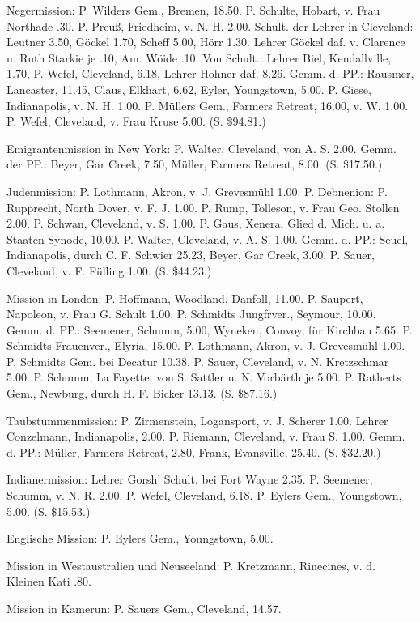 Negermission: P. Wilders Gem., Bremen, 18.50. P. Schulte, Hobart, v. Frau Northade .30. P. Preuß, Friedheim, v. N. H. 2.00. Schult. der Lehrer in Cleveland: Leutner 3.50, Göckel 1.70, Scheff 5.00, Hörr 1.30. Lehrer Göckel daf. v. Clarence u. Ruth Starkie je .10, Am. Wöide .10. Von Schult.: Lehrer Biel, Kendallville, 1.70, P. Wefel, Cleveland, 6.18, Lehrer Hohner daf. 8.26. Gemm. d. PP.: Rausmer, Lancaster, 11.45, Claus, Elkhart, 6.62, Eyler, Youngstown, 5.00. P. Giese, Indianapolis, v. N. H. 1.00. P. Müllers Gem., Farmers Retreat, 16.00, v. W. 1.00. P. Wefel, Cleveland, v. Frau Kruse 5.00. (S. \$94.81.)

Emigrantenmission in New York: P. Walter, Cleveland, von A. S. 2.00. Gemm. der PP.: Beyer, Gar Creek, 7.50, Müller, Farmers Retreat, 8.00. (S. \$17.50.)

Judenmission: P. Lothmann, Akron, v. J. Grevesmühl 1.00. P. Debnenion: P. Rupprecht, North Dover, v. F. J. 1.00. P. Rump, Tolleson, v. Frau Geo. Stollen 2.00. P. Schwan, Cleveland, v. S. 1.00. P. Gaus, Xenera, Glied d. Mich. u. a. Staaten-Synode, 10.00. P. Walter, Cleveland, v. A. S. 1.00. Gemm. d. PP.: Seuel, Indianapolis, durch C. F. Schwier 25.23, Beyer, Gar Creek, 3.00. P. Sauer, Cleveland, v. F. Fülling 1.00. (S. \$44.23.)

Mission in London: P. Hoffmann, Woodland, Danfoll, 11.00. P. Saupert, Napoleon, v. Frau G. Schult 1.00. P. Schmidts Jungfrver., Seymour, 10.00. Gemm. d. PP.: Seemener, Schumm, 5.00, Wyneken, Convoy, für Kirchbau 5.65. P. Schmidts Frauenver., Elyria, 15.00. P. Lothmann, Akron, v. J. Grevesmühl 1.00. P. Schmidts Gem. bei Decatur 10.38. P. Sauer, Cleveland, v. N. Kretzschmar 5.00. P. Schumm, La Fayette, von S. Sattler u. N. Vorbärth je 5.00. P. Ratherts Gem., Newburg, durch H. F. Bicker 13.13. (S. \$87.16.)

Taubstummenmission: P. Zirmenstein, Logansport, v. J. Scherer 1.00. Lehrer Conzelmann, Indianapolis, 2.00. P. Riemann, Cleveland, v. Frau S. 1.00. Gemm. d. PP.: Müller, Farmers Retreat, 2.80, Frank, Evansville, 25.40. (S. \$32.20.)

Indianermission: Lehrer Gorsh’ Schult. bei Fort Wayne 2.35. P. Seemener, Schumm, v. N. R. 2.00. P. Wefel, Cleveland, 6.18. P. Eylers Gem., Youngstown, 5.00. (S. \$15.53.)

Englische Mission: P. Eylers Gem., Youngstown, 5.00.

Mission in Westaustralien und Neuseeland: P. Kretzmann, Rinecines, v. d. Kleinen Kati .80.

Mission in Kamerun: P. Sauers Gem., Cleveland, 14.57.

